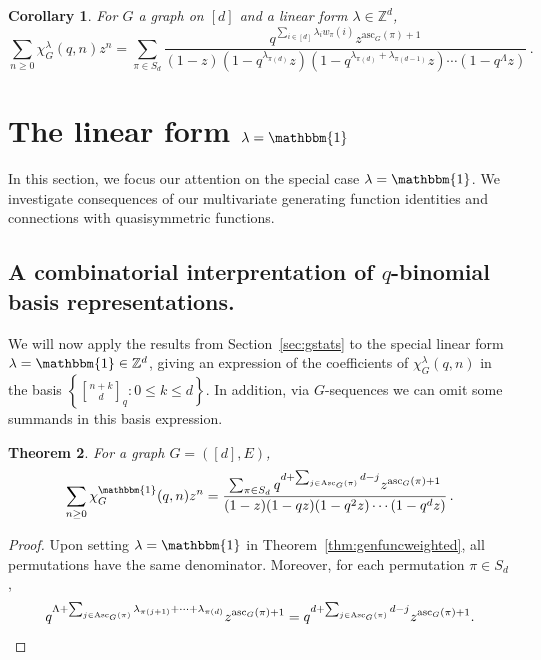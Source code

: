 \documentclass[11pt]{amsart}
\newtheorem{theorem}{Theorem}  [section] \numberwithin{equation}{section}
\newtheorem{corollary}[theorem]{Corollary}
\newcommand{\asc}{\mathrm{Asc}}
\newcommand{\ascnum}{\mathrm{asc}}
\newcommand{\qbinom}[2]{\genfrac[]{0pt}{}{#1}{#2}_q}
\begin{document}
\begin{corollary}
    For $G$ a graph on $[d]$ and a linear form $\lambda \in \mathbb{Z}^d$,
    \[
        \sum_{n \geq 0} \chi^\lambda_G(q,n) z^n = \sum_{\pi \in S_d} \frac{q^{\sum_{i \in [d]} \lambda_i
w_\pi(i)} z^{\ascnum_G(\pi)+1} }{(1-z)(1-q^{\lambda_{\pi(d)}}z) (1-q^{\lambda_{\pi(d)} + \lambda_{\pi(d-1)} } z)
\cdots (1-q^\Lambda z)}  \, .
    \]
\end{corollary}



\section{The linear form $\lambda=\mathbbm{1}$}\label{sec:linearform1}

In this section, we focus our attention on the special case $\lambda=\mathbbm{1}$.
We investigate consequences of our multivariate generating function identities and connections with quasisymmetric functions.

\subsection{A combinatorial interprentation of $q$-binomial basis representations.}
We will now apply the results from Section~\ref{sec:gstats} to the special linear form $\lambda = \mathbbm{1}
\in \mathbb{Z}^d$, giving an expression of the coefficients of $\chi_G^\lambda(q,n)$ in the basis $\left\{\qbinom{n+k}{d} : 0 \leq k \leq d\right\}$. 
In addition, via $G$-sequences we can omit some summands in this basis expression.

\begin{theorem}\label{thm:qchromaticallones}
    For a graph $G = ([d],E)$, 
    \[
        \sum_{n \geq 0} \chi^\mathbbm{1}_G(q,n) z^n =  \frac{\sum_{\pi \in S_d} q^{d + \sum_{j \in \asc_G(\pi)}
d-j} z^{\ascnum_G(\pi)+1} }{(1-z)(1-q z) (1-q^{2} z) \cdots (1-q^d z)} \, .
    \]
\end{theorem}

\begin{proof}
    Upon setting $\lambda=\mathbbm{1}$ in Theorem~\ref{thm:genfuncweighted}, all permutations have the same denominator. Moreover, for each permutation $\pi \in S_d$, 
    \[
        q^{\Lambda + \sum_{j \in \asc_G(\pi)} \lambda_{\pi(j+1)} + \cdots + \lambda_{\pi(d)}}
z^{\ascnum_G(\pi)+1}  = q^{d + \sum_{j \in \asc_G(\pi)} d-j } z^{\ascnum_G(\pi)+1}. \qedhere 
    \]
\end{proof}
\end{document}

